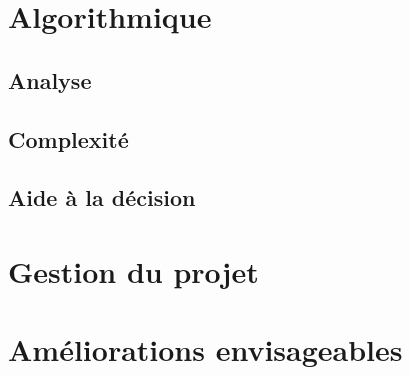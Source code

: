 \documentclass[a4paper,11pt]{article}
\begin{document}
\section{Algorithmique}
  \subsection{Analyse} 
  \subsection{Complexité} 
  \subsection{Aide à la décision} 
\section{Gestion du projet}
  
\section{Améliorations envisageables}
  

\end{document}

